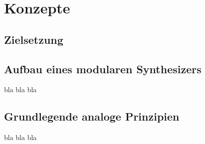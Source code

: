 \chapter{Konzepte}
\label{ch:concept}
\section{Zielsetzung}


\section{Aufbau eines modularen Synthesizers}
bla bla bla

\section{Grundlegende analoge Prinzipien}
bla bla bla



